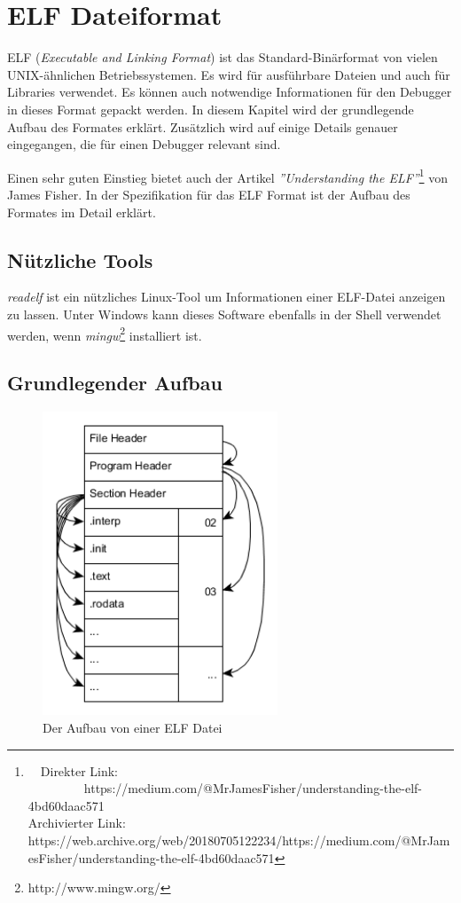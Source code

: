 \chapter{ELF Dateiformat}
ELF (\textit{Executable and Linking Format}) ist das Standard-Binärformat von vielen UNIX-ähnlichen Betriebssystemen.
Es wird für ausführbare Dateien und auch für Libraries verwendet.
Es können auch notwendige Informationen für den Debugger in dieses Format gepackt werden.
In diesem Kapitel wird der grundlegende Aufbau des Formates erklärt.
Zusätzlich wird auf einige Details genauer eingegangen, die für einen Debugger relevant sind.

Einen sehr guten Einstieg bietet auch der Artikel \textit{''Understanding the ELF''}\footnote{\ \ Direkter Link: \ \ \ \ \ \ \ \ \ https://medium.com/@MrJamesFisher/understanding-the-elf-4bd60daac571\\ Archivierter Link: https://web.archive.org/web/20180705122234/https://medium.com/@MrJamesFisher/understanding-the-elf-4bd60daac571} von James Fisher.
In der Spezifikation für das ELF Format\cite{bib:ELFSpecification} ist der Aufbau des Formates im Detail erklärt.


\section{Nützliche Tools}
\textit{readelf} ist ein nützliches Linux-Tool um Informationen einer ELF-Datei anzeigen zu lassen.
Unter Windows kann dieses Software ebenfalls in der Shell verwendet werden, wenn \textit{mingw}\footnote{http://www.mingw.org/} installiert ist.

\section{Grundlegender Aufbau}
\begin{figure}[htbp]
	\centering
		\includegraphics[width=7cm,keepaspectratio]{graphs/elf.png}
	\caption[Der Aufbau von einer ELF Datei]{Der Aufbau von einer ELF Datei\footnotemark}
	\label{fig:ELFStructure}
\end{figure}

